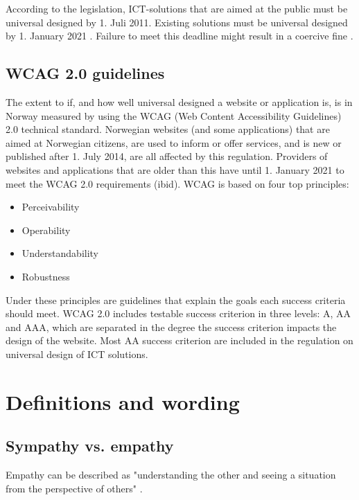 According to the legislation, ICT-solutions that are aimed at the public must be universal designed by 1. Juli 2011. Existing solutions must be universal designed by 1. January 2021 \parencite{_lov_2013}. Failure to meet this deadline might result in a coercive fine \parencite{_lov_2013}.

\subsection{WCAG 2.0 guidelines}
The extent to if, and how well universal designed a website or application is, is in Norway measured by using the \Gls{WCAG} (Web Content Accessibility Guidelines) 2.0 technical standard. Norwegian websites (and some applications) that are aimed at Norwegian citizens, are used to inform or offer services, and is new or published after 1. July 2014, are all affected by this regulation. Providers of websites and applications that are older than this have until 1. January 2021 to meet the WCAG 2.0 requirements (ibid).
\Gls{WCAG} is based on four top principles:
\begin{itemize}
    \item Perceivability
    \item Operability
    \item Understandability
    \item Robustness
\end{itemize}

Under these principles are guidelines that explain the goals each success criteria should meet. WCAG 2.0 includes testable success criterion in three levels: A, AA and AAA, which are separated in the degree the success criterion impacts the design of the website. Most AA success criterion are included in the regulation on universal design of ICT solutions. %


\section{Definitions and wording}
\subsection{Sympathy vs. empathy}
Empathy can be described as "understanding the other and seeing a situation from the perspective of others" \parencite{lundstrom_perceptions_2015}.  



